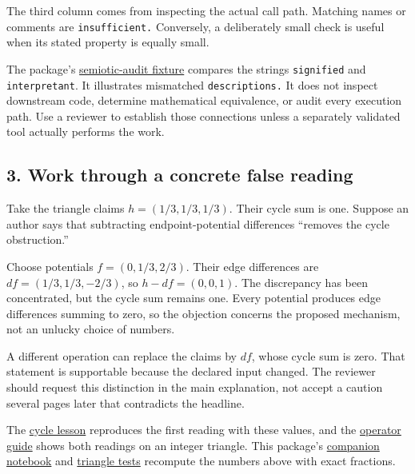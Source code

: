 \documentclass[
  11pt,
]{article}
\newcommand{\passthrough}[1]{#1}
\begin{document}
The third column comes from inspecting the actual call path. Matching
names or comments are \nolinkurl{insufficient.} Conversely, a
deliberately small check is useful when its stated property is equally
small.

The package's
\href{code/tests/test_009_adversarial_reality_gate.py}{semiotic-audit
fixture} compares the strings \passthrough{\lstinline!signified!} and
\passthrough{\lstinline!interpretant!}. It illustrates mismatched
\nolinkurl{descriptions.} It does not inspect downstream code, determine
mathematical equivalence, or audit every execution path. Use a reviewer
to establish those connections unless a separately validated tool
actually performs the work.

\subsection{3. Work through a concrete false
reading}\label{work-through-a-concrete-false-reading}

Take the triangle claims \(h=(1/3,\allowbreak 1/3,\allowbreak 1/3)\).
Their cycle sum is one. Suppose an author says that subtracting
endpoint-potential differences ``removes the cycle obstruction.''

Choose potentials \(f=(0,\allowbreak 1/3,\allowbreak 2/3)\). Their edge
differences are \(df=(1/3,\allowbreak 1/3,\allowbreak -2/3)\), so
\(h-df=(0,\allowbreak 0,\allowbreak 1)\). The discrepancy has been
concentrated, but the cycle sum remains one. Every potential produces
edge differences summing to zero, so the objection concerns the proposed
mechanism, not an unlucky choice of numbers.

A different operation can replace the claims by \(df\), whose cycle sum
is zero. That statement is supportable because the declared input
changed. The reviewer should request this distinction in the main
explanation, not accept a caution several pages later that contradicts
the headline.

The
\href{https://github.com/dbccpage/the_symbol_game/blob/52cb5457f6c485ba548cfd292f6012a941ed22cf/education/the_symbol_game/lessons/system_integration/100_novices/04_cycle_repair.ipynb}{cycle
lesson} reproduces the first reading with these values, and the
\href{https://github.com/dbccpage/the_symbol_game/blob/593230f7daba7aa04d7c41dd456dfbd00a39bcbd/atlas/coda_atlas/pfp/005_pfp_practitioners_field_manual/paper.md}{operator
guide} shows both readings on an integer triangle. This package's
\href{jupyter_notebooks/009_triangle_cycle_sum.ipynb}{companion
notebook} and \href{code/tests/test_triangle_cycle_sum.py}{triangle
tests} recompute the numbers above with exact fractions.
\end{document}
